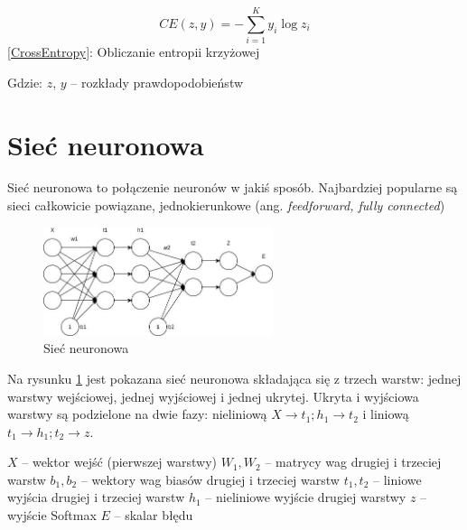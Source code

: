 \documentclass{article}
\begin{document}
\begin{center}
	\begin{equation}	
		CE(z, y) = -\sum_{i=1}^{K}y_i \log z_i
		\label{CrossEntropy}
	\end{equation}
	\ref{CrossEntropy}: Obliczanie entropii krzyżowej
\end{center} 

\begin{flushleft}
	Gdzie:\newline
	$z$, $y$ -- rozkłady prawdopodobieństw
\end{flushleft}

\section{Sieć neuronowa}
Sieć neuronowa to połączenie neuronów w jakiś sposób. Najbardziej popularne są sieci całkowicie powiązane, jednokierunkowe (ang. \textit{feedforward, fully connected})

\begin{figure}[H]
	\centering
	\includegraphics[width=0.6\textwidth,keepaspectratio=true]{feed_forward_network}
	\caption{
		Sieć neuronowa  
	}
	\label{feed_forward_network}
\end{figure}

Na rysunku \ref{feed_forward_network} jest pokazana sieć neuronowa składająca się z trzech warstw: jednej warstwy wejściowej, jednej wyjściowej i jednej ukrytej. Ukryta i wyjściowa warstwy są podzielone na dwie fazy: nieliniową $X \rightarrow t_1; h_1 \rightarrow t_2$ i liniową $t_1 \rightarrow h_1; t_2 \rightarrow z$.

\begin{flushleft}
	$X$ -- wektor wejść (pierwszej warstwy) \newline
	$W_1, W_2$ -- matrycy wag drugiej i trzeciej warstw \newline
	$b_1, b_2$ -- wektory wag biasów drugiej i trzeciej warstw \newline
	$t_1, t_2$ -- liniowe wyjścia drugiej i trzeciej warstw \newline
	$h_1$ -- nieliniowe wyjście drugiej warstwy \newline
	$z$ -- wyjście Softmax \newline
	$E$ -- skalar błędu
\end{flushleft}
\end{document}
